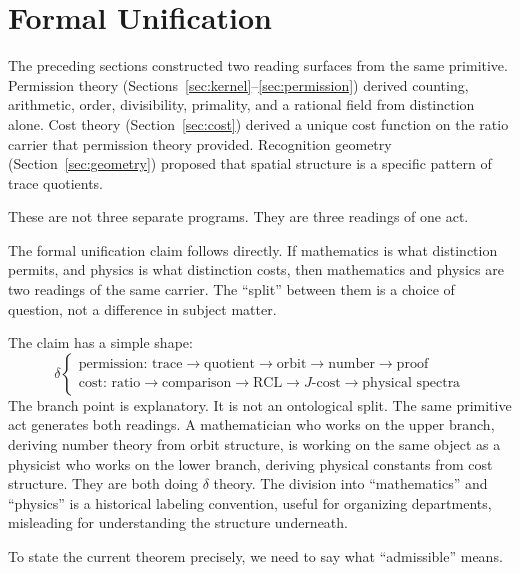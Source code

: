 \documentclass[11pt,a4paper]{article}
\theoremstyle{definition}
\theoremstyle{remark}
\begin{document}
\section{Formal Unification}\label{sec:unification}

The preceding sections constructed two reading surfaces from the same
primitive. Permission theory (Sections~\ref{sec:kernel}--\ref{sec:permission})
derived counting, arithmetic, order, divisibility, primality, and a rational
field from distinction alone. Cost theory (Section~\ref{sec:cost}) derived
a unique cost function on the ratio carrier that permission theory provided.
Recognition geometry (Section~\ref{sec:geometry}) proposed that spatial
structure is a specific pattern of trace quotients.

These are not three separate programs. They are three readings of one act.

The formal unification claim follows directly. If mathematics is what
distinction permits, and physics is what distinction costs, then mathematics
and physics are two readings of the same carrier. The ``split'' between them is
a choice of question, not a difference in subject matter.

The claim has a simple shape:
\[
  \delta
  \begin{cases}
    \text{permission: trace}\to\text{quotient}\to\text{orbit}\to
      \text{number}\to\text{proof} \\
    \text{cost: ratio}\to\text{comparison}\to\text{RCL}\to
      J\text{-cost}\to\text{physical spectra}
  \end{cases}
\]
The branch point is explanatory. It is not an ontological split. The same
primitive act generates both readings. A mathematician who works on the upper
branch, deriving number theory from orbit structure, is working on the same
object as a physicist who works on the lower branch, deriving physical
constants from cost structure. They are both doing $\delta$ theory. The
division into ``mathematics'' and ``physics'' is a historical labeling
convention, useful for organizing departments, misleading for understanding
the structure underneath.

To state the current theorem precisely, we need to say what ``admissible''
means.
\end{document}
